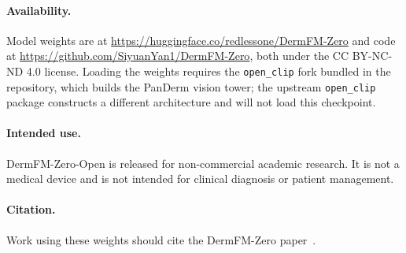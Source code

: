 \documentclass{article}
\begin{document}
\paragraph{Availability.}
Model weights are at \url{https://huggingface.co/redlessone/DermFM-Zero} and code at \url{https://github.com/SiyuanYan1/DermFM-Zero}, both under the CC BY-NC-ND 4.0 license. Loading the weights requires the \texttt{open\_clip} fork bundled in the repository, which builds the PanDerm vision tower; the upstream \texttt{open\_clip} package constructs a different architecture and will not load this checkpoint.

\paragraph{Intended use.}
DermFM-Zero-Open is released for non-commercial academic research. It is not a medical device and is not intended for clinical diagnosis or patient management.

\paragraph{Citation.}
Work using these weights should cite the DermFM-Zero paper~\cite{dermfmzero}.



\end{document}

